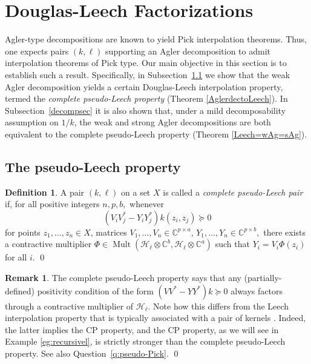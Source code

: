 \documentclass[a4paper,reqno,index]{amsart}
\numberwithin{equation}{section}
\newcommand{\Mult}{\operatorname{Mult}}
\newcommand{\opphi}[4]{{#1}\in \Mult({#3},{#4})}
\theoremstyle{definition}
\newtheorem{definition}[theorem]{Definition}
\newtheorem{remark}[theorem]{Remark}
\begin{document}
 \section{Douglas-Leech Factorizations} \label{Leechsecc}

   Agler-type decompositions are known to yield Pick interpolation theorems. Thus, one expects pairs $(k, \ell)$ supporting an Agler decomposition to admit interpolation theorems of Pick type. Our main objective in this section is to establish such a result. Specifically, in Subsection~\ref{Leechsec} we show that the weak Agler decomposition yields a certain Douglas-Leech interpolation property, termed the \textit{complete pseudo-Leech property} (Theorem \ref{AglerdectoLeech}).  In Subsection~\ref{decompsec} it is also shown that, under a mild decomposability assumption on $1/k$, the weak and strong Agler decompositions are both equivalent to the complete pseudo-Leech property (Theorem \ref{Leech=wAg=sAg}).



\subsection{The pseudo-Leech property} \label{Leechsec}


\begin{definition} \label{Leechdef}
A pair $(k, \ell)$ on a set $X$ is called a \textit{complete pseudo-Leech pair} if, for all positive integers $n,p,b,$ whenever 
\begin{equation} \label{leech-data1}
    (V_iV_j^*-Y_iY_j^*)k(z_i, z_j)\succeq 0  
\end{equation}
for points $z_1, \dots, z_n\in X$,  matrices $V_1, \dots, V_n\in \mathbb{C}^{p\times a}$, $Y_1, \dots, Y_n\in \mathbb{C}^{p\times b},$  there exists a contractive multiplier $\opphi{\Phi}{X}{ \mathcal{H}_{\ell}\otimes \mathbb{C}^b}{  \mathcal{H}_{\ell}\otimes \mathbb{C}^a}$
 such that $Y_i=V_i\Phi(z_i)$ for all $i$.
 \qed
\end{definition}




\begin{remark}\label{pseudooutline}
    The complete pseudo-Leech property says that any (partially-defined) positivity condition of the form $(VV^*-YY^*)k\succeq 0$ always factors through a contractive multiplier of $\mathcal{H}_{\ell}$. Note how this differs from the Leech interpolation property that is typically associated with a pair of kernels \cite[Corollary 2.3]{Shimorin}. Indeed, the latter implies the CP property, and the CP property, as we will see in Example \ref{eg:recursivel}, is strictly stronger than the complete pseudo-Leech property. See also
     Question~\ref{q:pseudo-Pick}.
    \qed
\end{remark}
\end{document}
